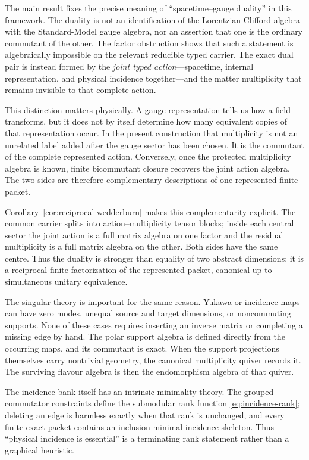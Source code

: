 \documentclass[11pt]{article}
\theoremstyle{definition}
\theoremstyle{remark}
\begin{document}
The main result fixes the precise meaning of ``spacetime--gauge duality'' in
this framework.  The duality is not an identification of the Lorentzian
Clifford algebra with the Standard-Model gauge algebra, nor an assertion that
one is the ordinary commutant of the other.  The factor obstruction shows that
such a statement is algebraically impossible on the relevant reducible typed
carrier.  The exact dual pair is instead formed by the \emph{joint typed
action}---spacetime, internal representation, and physical incidence
together---and the matter multiplicity that remains invisible to that complete
action.

This distinction matters physically.  A gauge representation tells us how a
field transforms, but it does not by itself determine how many equivalent
copies of that representation occur.  In the present construction that
multiplicity is not an unrelated label added after the gauge sector has been
chosen.  It is the commutant of the complete represented action.  Conversely,
once the protected multiplicity algebra is known, finite bicommutant closure
recovers the joint action algebra.  The two sides are therefore complementary
descriptions of one represented finite packet.

Corollary~\ref{cor:reciprocal-wedderburn} makes this complementarity explicit.
The common carrier splits into action--multiplicity tensor blocks; inside each
central sector the joint action is a full matrix algebra on one factor and the
residual multiplicity is a full matrix algebra on the other.  Both sides have
the same centre.  Thus the duality is stronger than equality of two abstract
dimensions: it is a reciprocal finite factorization of the represented packet,
canonical up to simultaneous unitary equivalence.

The singular theory is important for the same reason.  Yukawa or incidence
maps can have zero modes, unequal source and target dimensions, or
noncommuting supports.  None of these cases requires inserting an inverse
matrix or completing a missing edge by hand.  The polar support algebra is
defined directly from the occurring maps, and its commutant is exact.  When
the support projections themselves carry nontrivial geometry, the canonical
multiplicity quiver records it.  The surviving flavour algebra is then the
endomorphism algebra of that quiver.

The incidence bank itself has an intrinsic minimality theory.  The grouped
commutator constraints define the submodular rank function
\eqref{eq:incidence-rank}; deleting an edge is harmless exactly when that rank
is unchanged, and every finite exact packet contains an inclusion-minimal
incidence skeleton.  Thus ``physical incidence is essential'' is a terminating
rank statement rather than a graphical heuristic.
\end{document}
